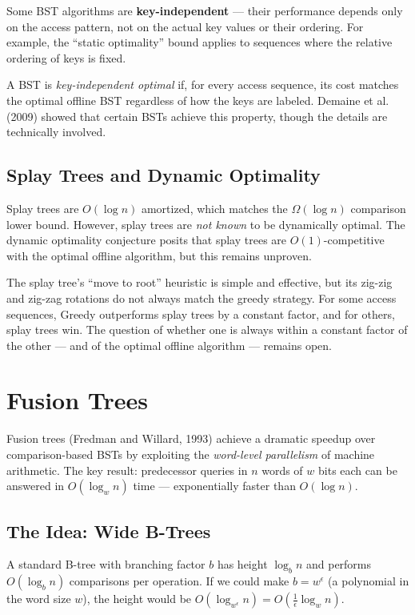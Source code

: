 Some BST algorithms are \textbf{key-independent} --- their performance depends only on the access pattern, not on the actual key values or their ordering. For example, the ``static optimality'' bound applies to sequences where the relative ordering of keys is fixed.

A BST is \textit{key-independent optimal} if, for every access sequence, its cost matches the optimal offline BST regardless of how the keys are labeled. Demaine et al. (2009) showed that certain BSTs achieve this property, though the details are technically involved.

\subsection{Splay Trees and Dynamic Optimality}

Splay trees are $O(\log n)$ amortized, which matches the $\Omega(\log n)$ comparison lower bound. However, splay trees are \textit{not known} to be dynamically optimal. The dynamic optimality conjecture posits that splay trees are $O(1)$-competitive with the optimal offline algorithm, but this remains unproven.

The splay tree's ``move to root'' heuristic is simple and effective, but its zig-zig and zig-zag rotations do not always match the greedy strategy. For some access sequences, Greedy outperforms splay trees by a constant factor, and for others, splay trees win. The question of whether one is always within a constant factor of the other --- and of the optimal offline algorithm --- remains open.

\section{Fusion Trees}

Fusion trees (Fredman and Willard, 1993) achieve a dramatic speedup over comparison-based BSTs by exploiting the \textit{word-level parallelism} of machine arithmetic. The key result: predecessor queries in $n$ words of $w$ bits each can be answered in $O(\log_w n)$ time --- exponentially faster than $O(\log n)$.

\subsection{The Idea: Wide B-Trees}

A standard B-tree with branching factor $b$ has height $\log_b n$ and performs $O(\log_b n)$ comparisons per operation. If we could make $b = w^\epsilon$ (a polynomial in the word size $w$), the height would be $O(\log_{w^\epsilon} n) = O(\frac{1}{\epsilon} \log_w n)$.

